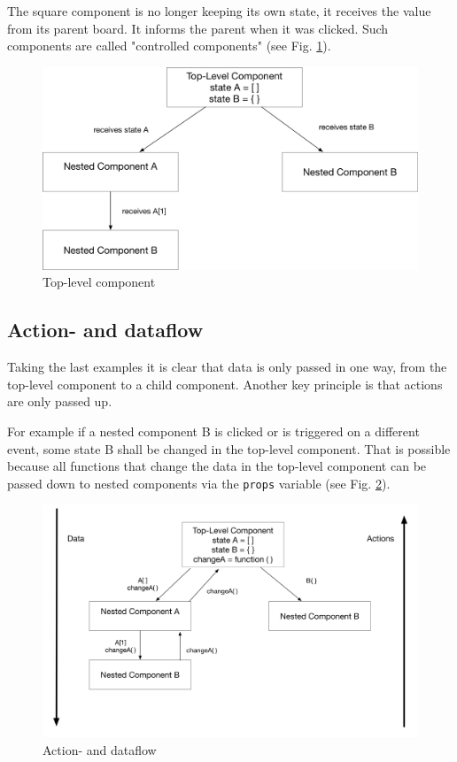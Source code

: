 The square component is no longer keeping its own state, it receives the value from its parent board. It informs the parent when it was clicked. Such components are called "controlled components" (see Fig. \ref{fig:TopLevel}).

\begin{figure}[H]
	\centering
	\includegraphics[width=1.0\linewidth]{bilder/grundlagen/topLevelComponent.png}
	\caption{Top-level component} 
	\label{fig:TopLevel}
\end{figure}


\subsection{Action- and dataflow}

Taking the last examples it is clear that data is only passed in one way, 
from the top-level component to a child component.
Another key principle is that actions are only passed up. 

For example if a nested component B is clicked or is triggered on a different event,  
some state B shall be changed in the top-level component. That is possible because 
all functions that change the data in the top-level component can be passed down 
to nested components via the \texttt{props} variable (see Fig. \ref{fig:DataFlow}).

\begin{figure}[H]
	\centering
	\includegraphics[width=1.0\linewidth]{bilder/grundlagen/dataFlow.png}
	\caption{Action- and dataflow}
	\label{fig:DataFlow}
\end{figure}


